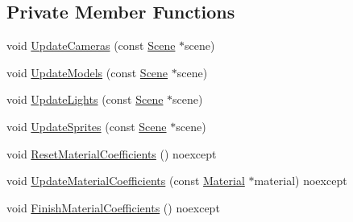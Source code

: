 \subsection*{Private Member Functions}
\begin{DoxyCompactItemize}
\item 
void \hyperlink{structmage_1_1_pass_buffer_a1ded2ce7cadbcb176aec69a85ba81c3e}{Update\+Cameras} (const \hyperlink{classmage_1_1_scene}{Scene} $\ast$scene)
\item 
void \hyperlink{structmage_1_1_pass_buffer_a02d68f950566e8283d3fc74bdf19b66a}{Update\+Models} (const \hyperlink{classmage_1_1_scene}{Scene} $\ast$scene)
\item 
void \hyperlink{structmage_1_1_pass_buffer_a91a779121ecb4c08605d3073c34674c9}{Update\+Lights} (const \hyperlink{classmage_1_1_scene}{Scene} $\ast$scene)
\item 
void \hyperlink{structmage_1_1_pass_buffer_a8301fd646965c627f29120f412078ca1}{Update\+Sprites} (const \hyperlink{classmage_1_1_scene}{Scene} $\ast$scene)
\item 
void \hyperlink{structmage_1_1_pass_buffer_a818fda1e63507217e0e852935ad172fb}{Reset\+Material\+Coefficients} () noexcept
\item 
void \hyperlink{structmage_1_1_pass_buffer_a6857c2e1be91655c58f8d91d02d9c60b}{Update\+Material\+Coefficients} (const \hyperlink{structmage_1_1_material}{Material} $\ast$material) noexcept
\item 
void \hyperlink{structmage_1_1_pass_buffer_ac9b83cdfcfcf963dd230099c39a45a8f}{Finish\+Material\+Coefficients} () noexcept
\end{DoxyCompactItemize}
